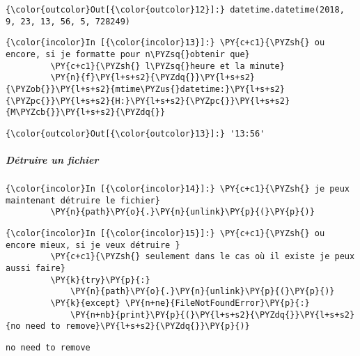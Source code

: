 \begin{Verbatim}[commandchars=\\\{\}]
{\color{outcolor}Out[{\color{outcolor}12}]:} datetime.datetime(2018, 9, 23, 13, 56, 5, 728249)
\end{Verbatim}
            
    \begin{Verbatim}[commandchars=\\\{\}]
{\color{incolor}In [{\color{incolor}13}]:} \PY{c+c1}{\PYZsh{} ou encore, si je formatte pour n\PYZsq{}obtenir que}
         \PY{c+c1}{\PYZsh{} l\PYZsq{}heure et la minute}
         \PY{n}{f}\PY{l+s+s2}{\PYZdq{}}\PY{l+s+s2}{\PYZob{}}\PY{l+s+s2}{mtime\PYZus{}datetime:}\PY{l+s+s2}{\PYZpc{}}\PY{l+s+s2}{H:}\PY{l+s+s2}{\PYZpc{}}\PY{l+s+s2}{M\PYZcb{}}\PY{l+s+s2}{\PYZdq{}}
\end{Verbatim}


\begin{Verbatim}[commandchars=\\\{\}]
{\color{outcolor}Out[{\color{outcolor}13}]:} '13:56'
\end{Verbatim}
            
    \hypertarget{duxe9truire-un-fichier}{%
\subparagraph{Détruire un fichier}\label{duxe9truire-un-fichier}}

    \begin{Verbatim}[commandchars=\\\{\}]
{\color{incolor}In [{\color{incolor}14}]:} \PY{c+c1}{\PYZsh{} je peux maintenant détruire le fichier}
         \PY{n}{path}\PY{o}{.}\PY{n}{unlink}\PY{p}{(}\PY{p}{)}
\end{Verbatim}


    \begin{Verbatim}[commandchars=\\\{\}]
{\color{incolor}In [{\color{incolor}15}]:} \PY{c+c1}{\PYZsh{} ou encore mieux, si je veux détruire }
         \PY{c+c1}{\PYZsh{} seulement dans le cas où il existe je peux aussi faire}
         \PY{k}{try}\PY{p}{:} 
             \PY{n}{path}\PY{o}{.}\PY{n}{unlink}\PY{p}{(}\PY{p}{)}
         \PY{k}{except} \PY{n+ne}{FileNotFoundError}\PY{p}{:}
             \PY{n+nb}{print}\PY{p}{(}\PY{l+s+s2}{\PYZdq{}}\PY{l+s+s2}{no need to remove}\PY{l+s+s2}{\PYZdq{}}\PY{p}{)}
\end{Verbatim}


    \begin{Verbatim}[commandchars=\\\{\}]
no need to remove

    \end{Verbatim}

